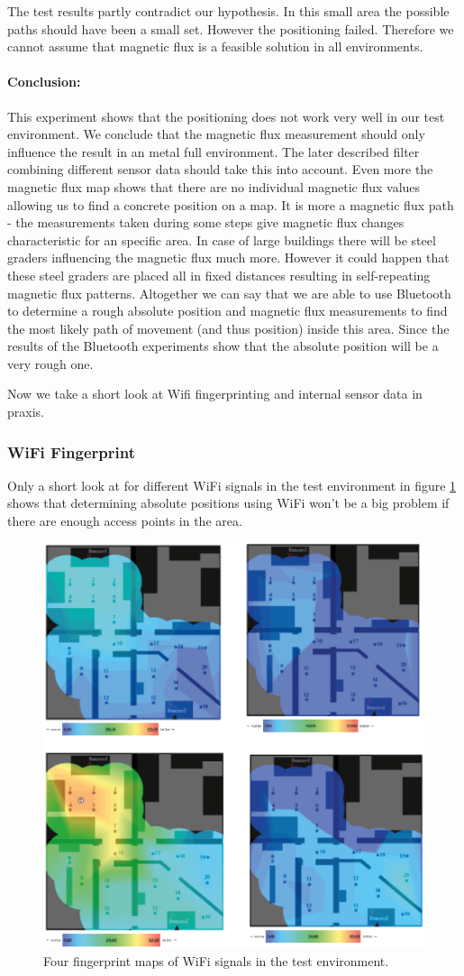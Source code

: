 The test results partly contradict our hypothesis. In this small area the possible paths should have been a small set. However the positioning failed. Therefore we cannot assume that magnetic flux is a feasible solution in all environments.

\paragraph{Conclusion: }
This experiment shows that the positioning does not work very well in our test environment. We conclude that the magnetic flux measurement should only influence the result in an metal full environment. The later described filter combining different sensor data should take this into account. Even more the magnetic flux map shows that there are no individual magnetic flux values allowing us to find a concrete position on a map. It is more a magnetic flux path - the measurements taken during some steps give magnetic flux changes characteristic for an specific area. 
In case of large buildings there will be steel graders influencing the magnetic flux much more. However it could happen that these steel graders are placed all in fixed distances resulting in self-repeating magnetic flux patterns. 
Altogether we can say that we are able to use Bluetooth to determine a rough absolute position and magnetic flux measurements to find the most likely path of movement (and thus position) inside this area. Since the results of the Bluetooth experiments show that the absolute position will be a very rough one. 

Now we take a short look at Wifi fingerprinting and internal sensor data in praxis. 

\subsubsection{WiFi Fingerprint}
Only a short look at for different WiFi signals in the test environment in figure \ref{fig:wifiTest} shows that determining absolute positions using WiFi won't be a big problem if there are enough access points in the area. 


\begin{figure}[h]
	\centering
		\includegraphics[width=.6\textwidth]{images/wifi.png}
	\caption{Four fingerprint maps of WiFi signals in the test environment.}
	\label{fig:wifiTest}
\end{figure}

